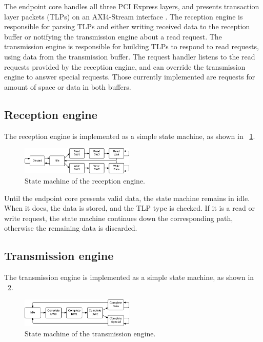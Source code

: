 The endpoint core handles all three PCI Express layers, and presents transaction layer packets (TLPs) on an AXI4-Stream interface \cite{ug672}.
The reception engine is responsible for parsing TLPs and either writing received data to the reception buffer or notifying the transmission engine about a read request.
The transmission engine is responsible for building TLPs to respond to read requests, using data from the transmission buffer.
The request handler listens to the read requests provided by the reception engine, and can override the transmission engine to answer special requests.
Those currently implemented are requests for amount of space or data in both buffers.

\subsection{Reception engine}

The reception engine is implemented as a simple state machine, as shown in \figurename~\ref{fig:statemachine-receive}.

\begin{figure}[!ht]
    \centering
    \includegraphics[width=0.48\textwidth]{figures/statemachine-receive}
    \caption{State machine of the reception engine.}
    \label{fig:statemachine-receive}
\end{figure}

Until the endpoint core presents valid data, the state machine remains in idle.
When it does, the data is stored, and the TLP type is checked.
If it is a read or write request, the state machine continues down the corresponding path, otherwise the remaining data is discarded.


\subsection{Transmission engine}

The transmission engine is implemented as a simple state machine, as shown in \figurename~\ref{fig:statemachine-transmit}.

\begin{figure}[!ht]
    \centering
    \includegraphics[width=0.48\textwidth]{figures/statemachine-transmit}
    \caption{State machine of the transmission engine.}
    \label{fig:statemachine-transmit}
\end{figure}

